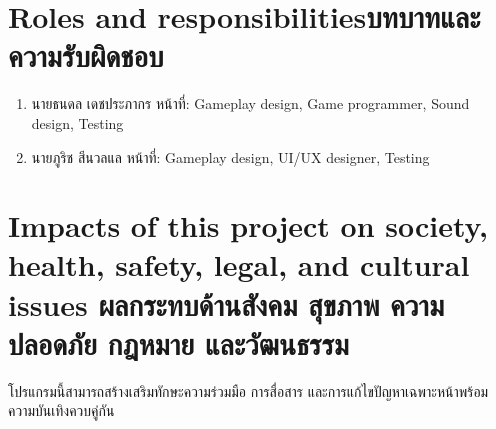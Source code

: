 \section{\ifenglish Roles and responsibilities\else บทบาทและความรับผิดชอบ\fi}
\begin{enumerate}
    \item นายธนดล เดชประภากร หน้าที่: Gameplay design, Game programmer, Sound design, Testing
    \item นายภูริช สีนวลแล หน้าที่: Gameplay design, UI/UX designer, Testing
\end{enumerate}

\section{\ifenglish%
Impacts of this project on society, health, safety, legal, and cultural issues
\else%
ผลกระทบด้านสังคม สุขภาพ ความปลอดภัย กฎหมาย และวัฒนธรรม
\fi}

โปรแกรมนี้สามารถสร้างเสริมทักษะความร่วมมือ การสื่อสาร และการแก้ไขปัญหาเฉพาะหน้าพร้อมความบันเทิงควบคู่กัน
